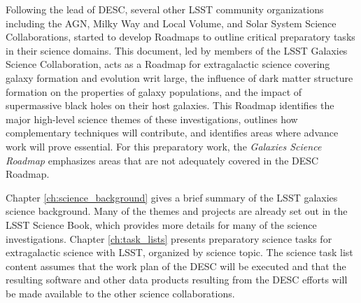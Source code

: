 {Following the lead of DESC, several other LSST community organizations 
including the AGN, Milky Way and Local Volume, and Solar System Science
Collaborations,
started to develop Roadmaps to outline critical preparatory tasks in
their science domains.
This document, led by members of the LSST Galaxies Science Collaboration, 
acts as a Roadmap for extragalactic science covering
galaxy formation and evolution writ large, the influence of dark matter structure
formation on the properties of galaxy populations, and the impact of supermassive
black holes on their host galaxies.
This Roadmap identifies the major high-level
science themes of these investigations, outlines how complementary techniques
will contribute, and identifies areas where advance work will prove essential. For this
preparatory work, the {\it Galaxies Science Roadmap} emphasizes areas that are not adequately 
covered in the DESC Roadmap. 

Chapter \ref{ch:science_background} gives a brief summary of the LSST galaxies science background.
Many of the themes and projects are already set out in the LSST Science Book, 
which provides more details for many of the science investigations. 
Chapter \ref{ch:task_lists} presents preparatory science tasks for 
extragalactic science with LSST, organized by science topic.
The science task list content assumes that the work plan of the DESC will be executed
and that the resulting software and other data products resulting from the DESC
efforts will be made available to the other science collaborations.
}
\let\cleardoublepage\clearpage

